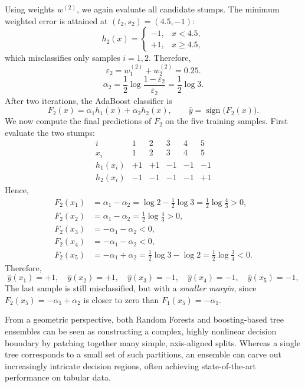 \documentclass[../main]{subfiles}
\begin{document}
\begin{solution}
    Using weights $w^{(2)}$, we again evaluate all candidate stumps.  
    The minimum weighted error is attained at $(t_2,s_2)=(4.5,-1)$:
    \[
    h_2(x)=
    \begin{cases}
    -1,& x<4.5,\\
    +1,& x\ge 4.5,
    \end{cases}
    \]
    which misclassifies only samples $i=1,2$. Therefore,
    \[
    \varepsilon_2=w_1^{(2)}+w_2^{(2)}=0.25.
    \]
    \[
    \alpha_2=\frac12\log\frac{1-\varepsilon_2}{\varepsilon_2}
    =\frac12\log 3.
    \]
    After two iterations, the AdaBoost classifier is
    \[
    F_2(x)=\alpha_1 h_1(x)+\alpha_2 h_2(x),
    \qquad
    \hat y=\operatorname{sign}\bigl(F_2(x)\bigr).
    \]
    We now compute the final predictions of $F_2$ on the five training samples.
    First evaluate the two stumps:
    \[
    \begin{array}{c|ccccc}
    i & 1 & 2 & 3 & 4 & 5\\ \hline
    x_i & 1 & 2 & 3 & 4 & 5\\ \hline
    h_1(x_i) & +1 & +1 & -1 & -1 & -1\\
    h_2(x_i) & -1 & -1 & -1 & -1 & +1
    \end{array}
    \]
    Hence, 
    \begin{align}
        F_2(x_1)&=\alpha_1-\alpha_2
        =\log 2-\frac12\log 3
        =\frac12\log\frac{4}{3}>0,\\
        F_2(x_2)&=\alpha_1-\alpha_2
        =\frac12\log\frac{4}{3}>0,\\
        F_2(x_3)&=-\alpha_1-\alpha_2<0,\\
        F_2(x_4)&=-\alpha_1-\alpha_2<0,\\
        F_2(x_5)&=-\alpha_1+\alpha_2
        =\frac12\log 3-\log 2
        =\frac12\log\frac{3}{4}<0.
    \end{align}
    Therefore,
    \[
    \hat y(x_1)=+1,\quad
    \hat y(x_2)=+1,\quad
    \hat y(x_3)=-1,\quad
    \hat y(x_4)=-1,\quad
    \hat y(x_5)=-1,
    \]
    The last sample is still misclassified, but with a \emph{smaller margin},
    since $F_2(x_5)=-\alpha_1+\alpha_2$ is closer to zero than
    $F_1(x_5)=-\alpha_1$.
\end{solution}
\begin{note}
    From a geometric perspective, both Random Forests and boosting-based tree
    ensembles can be seen as constructing a complex, highly nonlinear decision
    boundary by patching together many simple, axis-aligned splits.  Whereas a
    single tree corresponds to a small set of such partitions, an ensemble can
    carve out increasingly intricate decision regions, often achieving
    state-of-the-art performance on tabular data.
\end{note}
\end{document}
